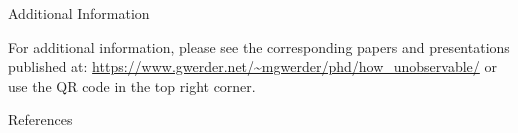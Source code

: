 \documentclass[10pt]{beamer}
\newlength{\onecolwid}
\begin{document}
\begin{frame}[t]
\begin{columns}[t]
\begin{column}{\onecolwid}

\begin{block}{Additional Information}
\raggedright
For additional information, please see the corresponding papers and presentations published at: {\footnotesize\href{https://www.gwerder.net/\~mgwerder/phd/how\_unobservable/}{https://www.gwerder.net/\textasciitilde mgwerder/phd/how\_unobservable/}} or use the QR code in the top right corner.
\vfill
\end{block}


\begin{block}{References}


\end{block}

\end{column} %

\end{columns} %

\end{frame} %
\end{document}
